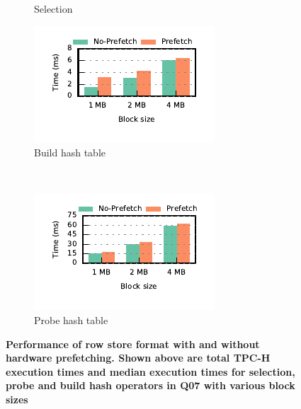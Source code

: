 \begin{figure}[t]
\begin{subfigure}[ht]{0.225\textwidth}
		\caption{Selection}
		\label{fig:prefetching-select-q07}
	\end{subfigure}
	\begin{subfigure}[ht]{0.225\textwidth}
		\includegraphics[width=\textwidth]{pipeline/figures/prefetching-q07-build-withlip-rowstore}
		\caption{Build hash table}
		\label{fig:prefetching-build-q07}
	\end{subfigure}
	~
	\begin{subfigure}[ht]{0.225\textwidth}
		\includegraphics[width=\textwidth]{pipeline/figures/prefetching-q07-probe-withlip-rowstore}
		\caption{Probe hash table}
		\label{fig:prefetching-probe-q07}
	\end{subfigure}
	\caption{\textbf{Performance of row store format with and without hardware prefetching. Shown above are total TPC-H execution times and median \wo{} execution times for selection, probe and build hash operators in Q07 with various block sizes}}
	\label{fig:prefetching-vs-noprefetching-rowstore}
\end{figure}

